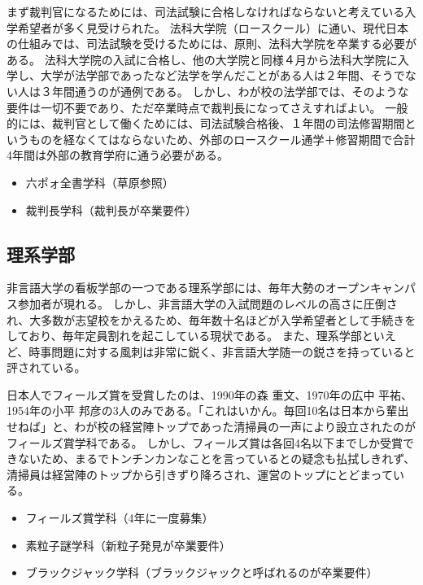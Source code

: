 まず裁判官になるためには、司法試験に合格しなければならないと考えている入学希望者が多く見受けられた。
法科大学院（ロースクール）に通い、現代日本の仕組みでは、司法試験を受けるためには、原則、法科大学院を卒業する必要がある。
法科大学院の入試に合格し、他の大学院と同様４月から法科大学院に入学し、大学が法学部であったなど法学を学んだことがある人は２年間、そうでない人は３年間通うのが通例である。
しかし、わが校の法学部では、そのような要件は一切不要であり、ただ卒業時点で裁判長になってさえすればよい。
一般的には、裁判官として働くためには、司法試験合格後、１年間の司法修習期間というものを経なくてはならないため、外部のロースクール通学＋修習期間で合計4年間は外部の教育学府に通う必要がある。

\begin{itemize} 
\item 六ポォ全書学科（草原参照）
\item 裁判長学科（裁判長が卒業要件）
\end{itemize}

\subsection{理系学部}
非言語大学の看板学部の一つである理系学部には、毎年大勢のオープンキャンパス参加者が現れる。
しかし、非言語大学の入試問題のレベルの高さに圧倒され、大多数が志望校をかえるため、毎年数十名ほどが入学希望者として手続きをしており、毎年定員割れを起こしている現状である。
また、理系学部といえど、時事問題に対する風刺は非常に鋭く、非言語大学随一の鋭さを持っていると評されている。
\par
日本人でフィールズ賞を受賞したのは、1990年の森 重文、1970年の広中 平祐、1954年の小平 邦彦の3人のみである。「これはいかん。毎回10名は日本から輩出せねば」と、わが校の経営陣トップであった清掃員の一声により設立されたのがフィールズ賞学科である。
しかし、フィールズ賞は各回4名以下までしか受賞できないため、まるでトンチンカンなことを言っているとの疑念も払拭しきれず、清掃員は経営陣のトップから引きずり降ろされ、運営のトップにとどまっている。

\begin{itemize}
\item フィールズ賞学科（4年に一度募集）
\item 素粒子謎学科（新粒子発見が卒業要件）
\item ブラックジャック学科（ブラックジャックと呼ばれるのが卒業要件）
\end{itemize}

